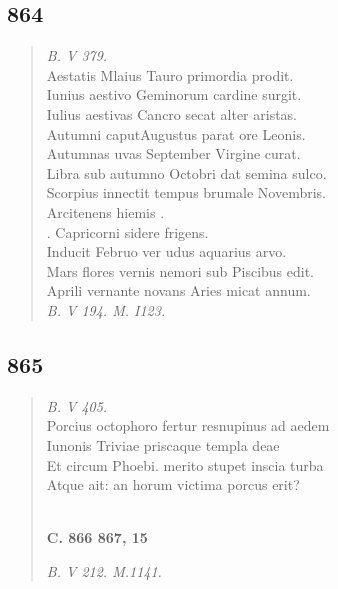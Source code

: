 \documentclass[11pt, a4paper]{report}
\begin{document}
            \subsection*{864}
      \begin{verse}
      \textit{B. V 379.} \\ Aestatis Mlaius Tauro primordia prodit. \\ Iunius aestivo Geminorum cardine surgit. \\ Iulius aestivas Cancro secat alter aristas. \\ Autumni caputAugustus parat ore Leonis. \\ Autumnas uvas September Virgine curat. \\ Libra sub autumno Octobri dat semina sulco. \\ Scorpius innectit tempus brumale Novembris. \\ Arcitenens hiemis . \\ . Capricorni sidere frigens. \\ Inducit Februo ver udus aquarius arvo. \\ Mars flores vernis nemori sub Piscibus edit. \\ Aprili vernante novans Aries micat annum. \\ \textit{B. V 194. M. I123.} \\ 
      \end{verse}
  
            \subsection*{865}
      \begin{verse}
      \textit{B. V 405.} \\ Porcius octophoro fertur resnupinus ad aedem \\ Iunonis Triviae priscaque templa deae \\ Et circum Phoebi. merito stupet inscia turba \\ Atque ait: an horum victima porcus erit? \\ 
        ﻿\pagebreak 
    \begin{center} \textbf{C. 866 867, 15} \end{center} \marginpar{[316]} \textit{B. V 212. M.1141.} \\ 
      \end{verse}
  
\end{document}

